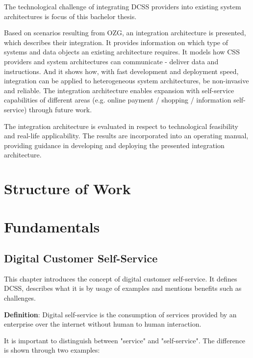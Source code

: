 \documentclass[
     12pt,         %
     a4paper,      %
     BCOR10mm,     %
     DIV14,        %
aragraph skip instad of paragraph indent
     ]{scrreprt}
\begin{document}
The technological challenge of integrating DCSS providers into existing system architectures is focus of this bachelor thesis.

Based on scenarios resulting from OZG, an integration architecture is presented, which describes
their integration. It provides information on which type of systems and data objects an existing
architecture requires. It models how CSS providers and system architectures can communicate -
deliver data and instructions. And it shows how, with fast development and deployment speed, integration can be applied to
heterogeneous system architectures, be non-invasive and reliable. The integration architecture enables expansion with 
self-service capabilities of different areas (e.g. online payment / shopping / information self-service) through future work.

The integration architecture is evaluated in respect to technological feasibility and real-life applicability. The results are
incorporated into an operating manual, providing guidance in developing and deploying the presented integration architecture.

\chapter{Structure of Work}



\chapter{Fundamentals}

\section{Digital Customer Self-Service}


This chapter introduces the concept of digital customer self-service. It defines DCSS, describes what it is by usage of examples and mentions benefits such as challenges.

\textbf{Definition}: Digital self-service is the consumption of services provided by an enterprise over the internet without human to human interaction.

It is important to distinguish between "service" and "self-service". The difference is shown through two examples:
\end{document}
